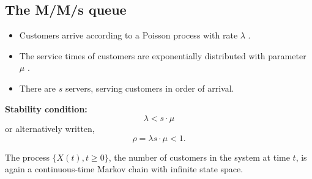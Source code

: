 \documentclass[a4paper12pt]{article}
\begin{document}
\large 




\subsection*{The M/M/s queue}
\begin{itemize}
\item  Customers arrive according to a Poisson process with rate $\lambda$ .
\item  The service times of customers are exponentially distributed with parameter $\mu$ .
\item  There are $s$ servers, serving customers in order of arrival.
\end{itemize}

\noindent \textbf{Stability condition:}
\[\lambda  < s\cdot \mu\]  or alternatively written, 
\[\rho = \lambda s\cdot \mu < 1.\]

The process $\{X(t), t \geq  0\}$, the number of customers in the system at time
$t$, is again a continuous-time Markov chain with infinite state space.

\end{document}
